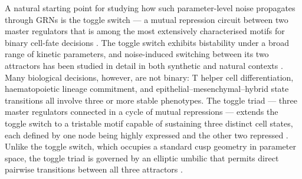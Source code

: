 \documentclass[11pt]{article}
\begin{document}
A natural starting point for studying how such parameter-level noise propagates through GRNs is the toggle switch — a mutual repression circuit between two master regulators that is among the most extensively characterised motifs for binary cell-fate decisions \cite{gardner2000construction}. The toggle switch exhibits bistability under a broad range of kinetic parameters, and noise-induced switching between its two attractors has been studied in detail in both synthetic and natural contexts \cite{tian2006stochastic}. Many biological decisions, however, are not binary: T helper cell differentiation, haematopoietic lineage commitment, and epithelial–mesenchymal–hybrid state transitions all involve three or more stable phenotypes. The toggle triad — three master regulators connected in a cycle of mutual repressions — extends the toggle switch to a tristable motif capable of sustaining three distinct cell states, each defined by one node being highly expressed and the other two repressed \cite{doi:10.1098/rsif.2020.0631}. Unlike the toggle switch, which occupies a standard cusp geometry in parameter space, the toggle triad is governed by an elliptic umbilic that permits direct pairwise transitions between all three attractors \cite{Duddu2025DistinctNetworks}.
\end{document}
